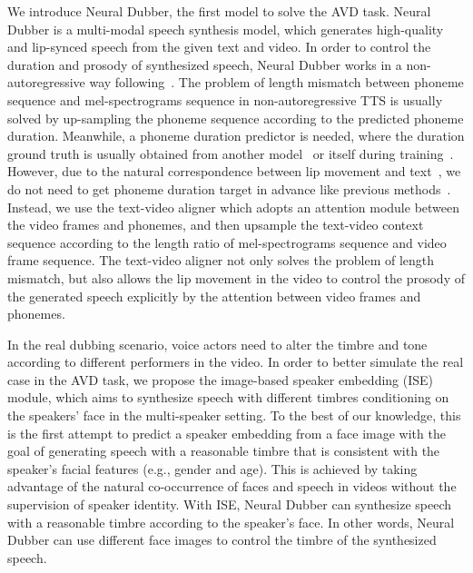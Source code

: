 \documentclass{article}
\begin{document}
We introduce Neural Dubber, the first model to solve the AVD task. Neural Dubber is a multi-modal speech synthesis model, which generates high-quality and lip-synced speech from the given text and video.
In order to control the duration and prosody of synthesized speech, Neural Dubber works in a non-autoregressive way following~\cite{ren2021fastspeech}. The problem of length mismatch between phoneme sequence and mel-spectrograms sequence in non-autoregressive TTS is usually solved by up-sampling the phoneme sequence according to the predicted phoneme duration. Meanwhile, a phoneme duration predictor is needed, where the duration ground truth is usually obtained from another model~\cite{ren2019fastspeech,ren2021fastspeech} or itself during training~\cite{kim2020glow}. However, due to the natural correspondence between lip movement and text~\cite{chung2017lip}, we do not need to get phoneme duration target in advance like previous methods~\cite{ren2019fastspeech, ren2021fastspeech, kim2020glow}. Instead, we use the text-video aligner which adopts an attention module between the video frames and phonemes, and then upsample the text-video context sequence according to the length ratio of mel-spectrograms sequence and video frame sequence. The text-video aligner not only solves the problem of length mismatch, but also allows the lip movement in the video to control the prosody of the generated speech explicitly by the attention between video frames and phonemes.


In the real dubbing scenario, voice actors need to alter the timbre and tone according to different performers in the video. In order to better simulate the real case in the AVD task, we propose the image-based speaker embedding (ISE) module, which aims to synthesize speech with different timbres conditioning on the speakers' face in the multi-speaker setting. To the best of our knowledge, this is the first attempt to predict a speaker embedding from a face image with the goal of generating speech with a reasonable timbre that is consistent with the speaker's facial features (e.g., gender and age). This is achieved by taking advantage of the natural co-occurrence of faces and speech in videos without the supervision of speaker identity.
With ISE, Neural Dubber can synthesize speech with a reasonable timbre according to the speaker's face. In other words, Neural Dubber can use different face images to control the timbre of the synthesized speech.
\end{document}
